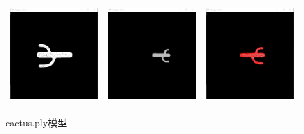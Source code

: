 \documentclass[logo,reportComp]{thesis}
\begin{document}
\begin{figure}[H]
\centering
\begin{tabular}{ccc}
\includegraphics[width=0.33\linewidth]{fig/cactus1.png} &
\includegraphics[width=0.33\linewidth]{fig/cactus2.png} &
\includegraphics[width=0.33\linewidth]{fig/cactus3.png}
\end{tabular}
\caption{cactus.ply模型}
\label{fig:cactus}
\end{figure}
\end{document}
